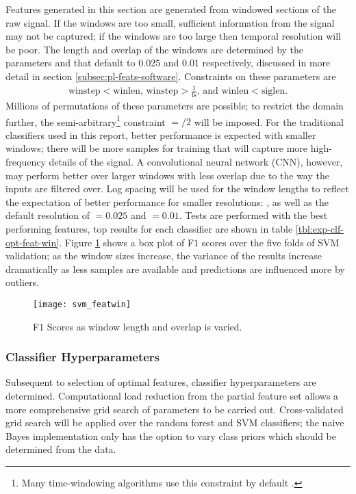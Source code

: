             Features generated in this section are generated from windowed sections of the raw signal. If the windows are too small, sufficient information from the signal may not be captured; if the windows are too large then temporal resolution will be poor. The length and overlap of the windows are determined by the parameters  and  that default to $0.025$ and $0.01$ respectively, discussed in more detail in section \ref{subsec:pl-feats-software}. Constraints on these parameters are 
            \begin{align}
                \text{winstep} < \text{winlen, winstep} > \frac{1}{\text{fs}} \text{, and winlen} < \text{siglen}.
            \end{align}
            Millions of permutations of these parameters are possible; to restrict the domain further, the semi-arbitrary\footnote{Many time-windowing algorithms use this constraint by default \cite{MathWorks,Octave}.} constraint $=$$/2$ will be imposed. For the traditional classifiers used in this report, better performance is expected with smaller windows; there will be more samples for training that will capture more high-frequency details of the signal. A convolutional neural network (CNN), however, may perform better over larger windows with less overlap \cite{Han} due to the way the inputs are filtered over. Log spacing will be used for the window lengths to reflect the expectation of better performance for smaller resolutions: \code{[0.01,0.016,0.024,0.037,0.058,0.089,0.136,0.209,0.32]}, as well as the default resolution of $=0.025$ and $=0.01$. Tests are performed with the best performing features, top results for each classifier are shown in table \ref{tbl:exp-clf-opt-feat-win}. Figure \ref{fig:exp-clf-opt-svmfeatwin} shows a box plot of F$1$ scores over the five folds of SVM validation; as the window sizes increase, the variance of the results increase dramatically as less samples are available and predictions are influenced more by outliers. 
            
            \begin{figure}[ht]
                \centering
                \texttt{[image: svm\_featwin]}
                \caption{F$1$ Scores as window length and overlap is varied.}
                \label{fig:exp-clf-opt-svmfeatwin}
            \end{figure}
  
        
        \subsubsection{Classifier Hyperparameters}
        \label{subsubsec:exp-clf-opt-param}
            Subsequent to selection of optimal features, classifier hyperparameters are determined. Computational load reduction from the partial feature set allows a more comprehensive grid search of parameters to be carried out. Cross-validated grid search will be applied over the random forest and SVM classifiers; the naive Bayes implementation only has the option to vary class priors which should be determined from the data.
            

